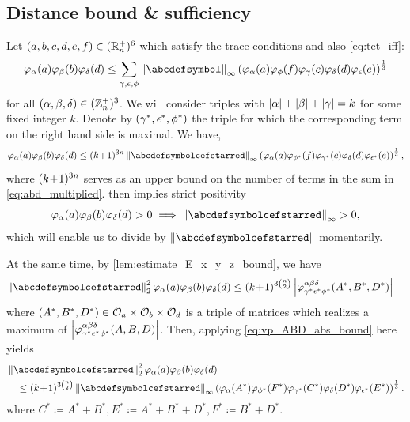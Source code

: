 \documentclass[notitlepage, 11pt, letterpaper]{amsart}
\begin{document}
\subsection{Distance bound \& sufficiency}

Let $(a,b,c,d,e,f) \in (\mathbb R^{+}_{n})^6$ which satisfy the trace conditions and also \cref{eq:tet_iff}:
\begin{equation}
    \label{eq:abd_multiplied}
    \vp_{\ya}(\ea)\vp_{\yb}(\eb)\vp_{\yd}(\ed)
    \leq \sum_{\yc,\ye,\yf} \norm{\abcdefsymbol}_{\infty}
    \left(
        \vp_{\ya}(\ea)\vp_{\yf}(\ef)
        \vp_{\yc}(\ec)\vp_{\yd}(\ed)
        \vp_{\ye}(\ee)
    \right)^{\frac{1}{3}}
\end{equation}
for all $(\alpha, \beta, \delta) \in (\mathbb Z^{+}_{n})^3$.
We will consider triples with $|\alpha| + |\beta| + |\gamma| = k$ for some fixed integer $k$.
Denote by $(\gamma^*, \epsilon^*, \phi^*)$ the triple for which the corresponding term on the right hand side is maximal.
We have,
\begin{equation}
    \label{eq:first_abd_bound}
    \vp_{\ya}(\ea)\vp_{\yb}(\eb)\vp_{\yd}(\ed)
    \leq \polyk{3n} \norm{\abcdefsymbolcefstarred}_{\infty}
    \left(
        \vp_{\ya}(\ea)\vp_{\yf^*}(\ef)
        \vp_{\yc^*}(\ec)\vp_{\yd}(\ed)
        \vp_{\ye^*}(\ee)
    \right)^{\frac{1}{3}}
    ,
\end{equation}
where $(k\!+\!1)^{3n}$ serves as an upper bound on the number of terms in the sum in \cref{eq:abd_multiplied}.
 then implies strict positivity
\begin{equation}
    \vp_{\ya}(\ea)\vp_{\yb}(\eb)\vp_{\yd}(\ed) > 0 \implies \norm{\abcdefsymbolcefstarred}_{\infty} >0,
\end{equation}
which will enable us to divide by $\norm{\abcdefsymbolcefstarred}$ momentarily.

At the same time, by \cref{lem:estimate_E_x_y_z_bound}, we have
\begin{align}
    \norm{\abcdefsymbolcefstarred}_{2}^{2} \vp_{\ya}(\ea)\vp_{\yb}(\eb)\vp_{\yd}(\ed)
    &\leq
    \polyk{3\binom{n}{2}}
    \abs{\vp^{\ya\yb\yd}_{\yc^*\ye^*\yf^*}(A^*,B^*,D^*)}
\end{align}
where $(A^*, B^*, D^*) \in \mathcal O_{a} \times \mathcal O_{b} \times \mathcal O_{d}$ is a triple of matrices which realizes a maximum of $\left|\varphi^{\alpha\beta\delta}_{\gamma^*\epsilon^*\phi^*}(A, B, D)\right|$.
Then, applying \cref{eq:vp_ABD_abs_bound} here yields
\begin{align}\label{eq:second_abd_bound}
    \begin{split}
        &\norm{\abcdefsymbolcefstarred}_{2}^{2} \vp_{\ya}(\ea)\vp_{\yb}(\eb)\vp_{\yd}(\ed)\\
        &\quad\leq
        \polyk{3\binom{n}{2}}
        \norm{\abcdefsymbolcefstarred}_{\infty}
        \left(\vp_{\ya}(A^*)\vp_{\yf^*}(F^*)\vp_{\yc^*}(C^*)\vp_{\yd}(D^{*})\vp_{\ye^*}(E^*)\right)^{\frac{1}{3}}.
    \end{split}
\end{align}
where $C^*\coloneqq A^*+B^*, E^*\coloneqq A^*+B^*+D^*, F^*\coloneqq B^*+D^*$.
\end{document}

